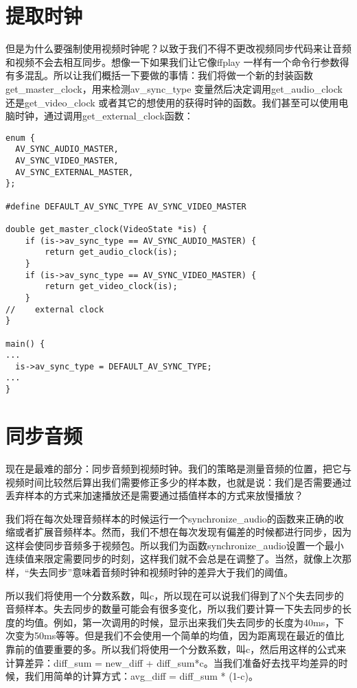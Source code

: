 \section{提取时钟}
但是为什么要强制使用视频时钟呢？以致于我们不得不更改视频同步代码来让音频和视频不会去相互同步。想像一下如果我们让它像ffplay 一样有一个命令行参数得有多混乱。所以让我们概括一下要做的事情：我们将做一个新的封装函数get_master_clock，用来检测av_sync_type 变量然后决定调用get_audio_clock还是get_video_clock 或者其它的想使用的获得时钟的函数。我们甚至可以使用电脑时钟，通过调用get_external_clock函数：

\begin{lstlisting}
enum {
  AV_SYNC_AUDIO_MASTER,
  AV_SYNC_VIDEO_MASTER,
  AV_SYNC_EXTERNAL_MASTER,
};

#define DEFAULT_AV_SYNC_TYPE AV_SYNC_VIDEO_MASTER

double get_master_clock(VideoState *is) {
    if (is->av_sync_type == AV_SYNC_AUDIO_MASTER) {
        return get_audio_clock(is);
    }
    if (is->av_sync_type == AV_SYNC_VIDEO_MASTER) {
        return get_video_clock(is);
    }
//    external clock
}

main() {
...
  is->av_sync_type = DEFAULT_AV_SYNC_TYPE;
...
}
\end{lstlisting}

\section{同步音频}

现在是最难的部分：同步音频到视频时钟。我们的策略是测量音频的位置，把它与视频时间比较然后算出我们需要修正多少的样本数，也就是说：我们是否需要通过丢弃样本的方式来加速播放还是需要通过插值样本的方式来放慢播放？

我们将在每次处理音频样本的时候运行一个synchronize_audio的函数来正确的收缩或者扩展音频样本。然而，我们不想在每次发现有偏差的时候都进行同步，因为这样会使同步音频多于视频包。所以我们为函数synchronize_audio设置一个最小连续值来限定需要同步的时刻，这样我们就不会总是在调整了。当然，就像上次那样，“失去同步”意味着音频时钟和视频时钟的差异大于我们的阈值。

所以我们将使用一个分数系数，叫c，所以现在可以说我们得到了N个失去同步的音频样本。失去同步的数量可能会有很多变化，所以我们要计算一下失去同步的长度的均值。例如，第一次调用的时候，显示出来我们失去同步的长度为40ms，下次变为50ms等等。但是我们不会使用一个简单的均值，因为距离现在最近的值比靠前的值要重要的多。所以我们将使用一个分数系数，叫c，然后用这样的公式来计算差异：diff_sum = new_diff + diff_sum*c。当我们准备好去找平均差异的时候，我们用简单的计算方式：avg_diff = diff_sum * (1-c)。

